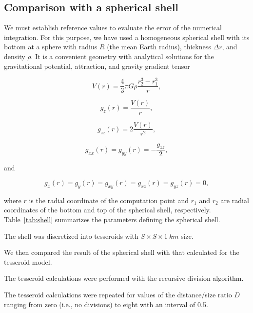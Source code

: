 \subsection{Comparison with a spherical shell}

We must establish reference values
to evaluate the error of the numerical integration.
For this purpose, we have used a homogeneous spherical shell
with its bottom at a sphere with radius $R$ (the mean Earth radius),
thickness $\Delta r$, and density $\rho$.
It is a convenient geometry
with analytical solutions for
the gravitational potential, attraction, and gravity gradient tensor
\citep{Grombein2013}

\begin{equation}
V(r) = \frac{4}{3}\pi G \rho \frac{r_2^3 - r_1^3}{r},
\end{equation}

\begin{equation}
g_z(r) = \frac{V(r)}{r},
\end{equation}

\begin{equation}
g_{zz}(r) = 2\frac{V(r)}{r^2},
\end{equation}

\begin{equation}
g_{xx}(r) = g_{yy}(r) = -\frac{g_{zz}}{2},
\end{equation}

\noindent
and

\begin{equation}
g_x(r) = g_y(r) = g_{xy}(r) = g_{xz}(r) = g_{yz}(r) = 0,
\end{equation}

\noindent
where $r$ is the radial coordinate of the computation point and
$r_1$ and $r_2$ are radial coordinates
of the bottom and top of the spherical shell, respectively.
Table~\ref{tab:shell} summarizes the parameters defining the spherical shell.

The shell was discretized into tesseroids with $S \times S \times 1\ km$ size.

We then compared the result of the spherical shell with that calculated for the
tesseroid model.

The tesseroid calculations were performed with the recursive division
algorithm.

The tesseroid calculations were repeated for values of the distance/size ratio
$D$ ranging from zero (i.e., no divisions) to eight with an interval of 0.5.




